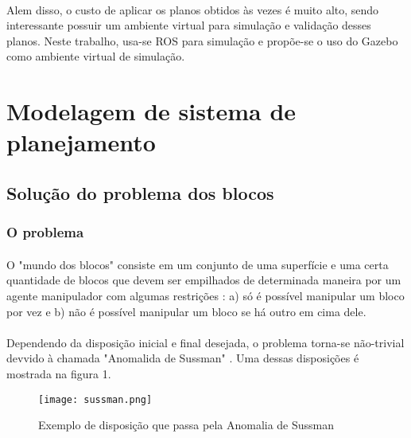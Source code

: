 \documentclass[12pt,titlepage]{article}
\begin{document}
	\paragraph{}
	Alem disso, o custo de aplicar os planos obtidos às vezes é muito alto, sendo interessante possuir um ambiente virtual para simulação e validação desses planos. Neste trabalho, usa-se ROS para simulação e propõe-se o uso do Gazebo como ambiente virtual de simulação. 



\section{Modelagem de sistema de planejamento}
\subsection{Solução do problema dos blocos}
\subsubsection{O problema}

\paragraph{}

O "mundo dos blocos" consiste em um conjunto de uma superfície e uma certa quantidade de blocos que devem ser empilhados de determinada maneira por um agente manipulador com algumas restrições : a) só é possível manipular um bloco por vez e b) não é possível manipular um bloco se há outro em cima dele.\cite{intart}

\paragraph{}

Dependendo da disposição inicial e final desejada, o problema torna-se não-trivial devvido à chamada "Anomalida de Sussman" \cite{modernapp}. Uma dessas disposições é mostrada na figura 1.

\begin{figure}[h!]
  \centering
  \texttt{[image: sussman.png]}
  \caption{Exemplo de disposição que passa pela Anomalia de Sussman}
  \label{fig:figura 1}
\end{figure}

\paragraph{}
\end{document}
